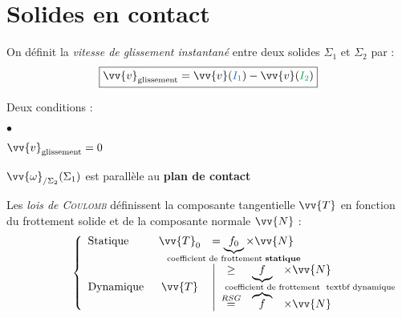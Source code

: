 \documentclass[11pt,a4paper,fleqn,pdftex]{report}
\begin{document}
\section{Solides en contact}
\begin{minipage}{7cm}
On définit la \emph{vitesse de glissement instantané} entre deux solides $\Sigma_1$ et $\Sigma_2$ par : 
\begin{equation}\label{eq:Glissement}\boxed{\vv{v}_{\text{glissement}}=\vv{v}(\textcolor{RoyalBlue}{I_1})-\vv{v}(\textcolor{ForestGreen}{I_2})}\end{equation}
\end{minipage}\hspace{1.5cm}
\begin{minipage}{5cm}
\end{minipage}
\begin{dfn}
Deux conditions : 
\begin{list}{$\bullet$}{ }
\item $\vv{v}_{\text{glissement}}=0$
\item $\vv{\omega}_{/\Sigma_2}(\Sigma_1)$ est parallèle au \textbf{plan de contact}
\end{list}
%
\end{dfn}
\begin{itheorem}
   Les \emph{lois de \textsc{Coulomb}} définissent la composante tangentielle $\vv{T}$ en fonction du frottement solide et de la composante normale $\vv{N}$ : \\
    \begin{equation}
      \left\lbrace
      \begin{array}{l c l}
      \text{Statique }&\vv{T}_0&=\underbrace{f_0}_{\mathclap{\text{coefficient de frottement \textbf{statique}}}}\times\vv{N}\\
      \text{Dynamique }&\vv{T}&
      \left|
      \begin{array}{c c l}
      \ge&\underbrace{f}_{\mathclap{\text{\hspace{3cm}coefficient de frottement \ textbf{ dynamique}}}}&\times\vv{N}\\
      \overset{RSG}{=}&\overbrace{f}&\times\vv{N}\\
      \end{array}
      \right.
      \end{array}
      \right.
    \end{equation}
\end{itheorem}
\end{document}

